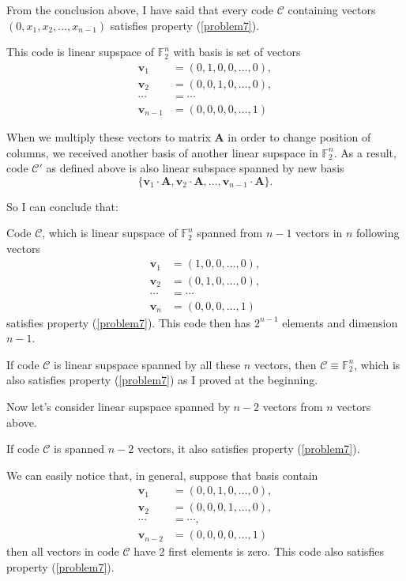 \documentclass{article}
\newcommand{\FF}{\mathbb{F}}
\begin{document}
From the conclusion above, I have said that every code $\mathcal{C}$ containing vectors $(0, x_1, x_2, \ldots, x_{n-1})$ satisfies property (\ref{problem7}).

This code is linear supspace of $\FF_2^n$ with basis is set of vectors
\begin{align*}
    \bm{v}_1 & = (0, 1, 0, 0, \ldots, 0), \\
    \bm{v}_2 & = (0, 0, 1, 0, \ldots, 0), \\
    \cdots & = \cdots \\
    \bm{v}_{n-1} & = (0, 0, 0, 0, \ldots, 1)
\end{align*}

When we multiply these vectors to matrix $\bm{A}$ in order to change position of columns, we received another basis of another linear supspace in $\FF_2^n$. As a result, code $\mathcal{C}'$ as defined above is also linear subspace spanned by new basis \[ \{ \bm{v}_1 \cdot \bm{A}, \bm{v}_2 \cdot \bm{A}, \ldots, \bm{v}_{n-1} \cdot \bm{A}\}. \]

So I can conclude that:

\begin{conclusion}
    Code $\mathcal{C}$, which is linear supspace of $\FF_2^n$ spanned from $n-1$ vectors in $n$ following vectors
    \begin{align*}
        \bm{v}_1 & = (1, 0, 0, \ldots, 0), \\
        \bm{v}_2 & = (0, 1, 0, \ldots, 0), \\
        \cdots & = \cdots \\
        \bm{v}_n & = (0, 0, 0, \ldots, 1)
    \end{align*}
    satisfies property (\ref{problem7}). This code then has $2^{n-1}$ elements and dimension $n-1$.

    If code $\mathcal{C}$ is linear supspace spanned by all these $n$ vectors, then $\mathcal{C} \equiv \FF_2^n$, which is also satisfies property (\ref{problem7}) as I proved at the beginning.
\end{conclusion}

Now let's consider linear supspace spanned by $n-2$ vectors from $n$ vectors above.

If code $\mathcal{C}$ is spanned $n-2$ vectors, it also satisfies property (\ref{problem7}).

We can easily notice that, in general, suppose that basis contain 
\begin{align*}
    \bm{v}_1 & = (0, 0, 1, 0, \ldots, 0), \\
    \bm{v}_2 & = (0, 0, 0, 1, \ldots, 0), \\
    \cdots & = \cdots, \\
    \bm{v}_{n-2} & = (0, 0, 0, 0, \ldots, 1)
\end{align*}
then all vectors in code $\mathcal{C}$ have 2 first elements is zero. This code also satisfies property (\ref{problem7}).
\end{document}
